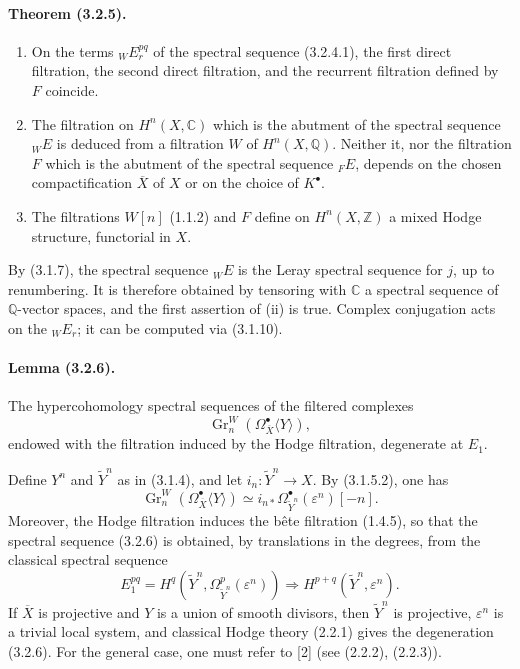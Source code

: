 \documentclass[10pt]{article}
\newcommand{\C}{\mathbb C}
\newcommand{\Q}{\mathbb Q}
\newcommand{\Z}{\mathbb Z}
\newcommand{\Gr}{\operatorname{Gr}}
\begin{document}
\paragraph{Theorem (3.2.5).}
\begin{enumerate}[label=(\roman*)]
\item On the terms ${}_WE_r^{pq}$ of the spectral sequence (3.2.4.1), the first direct filtration, the second direct filtration, and the recurrent filtration defined by $F$ coincide.
\item The filtration on $H^n(X,\C)$ which is the abutment of the spectral sequence ${}_WE$ is deduced from a filtration $W$ of $H^n(X,\Q)$. Neither it, nor the filtration $F$ which is the abutment of the spectral sequence ${}_FE$, depends on the chosen compactification $\overline X$ of $X$ or on the choice of $K^\bullet$.
\item The filtrations $W[n]$ (1.1.2) and $F$ define on $H^n(X,\Z)$ a mixed Hodge structure, functorial in $X$.
\end{enumerate}

By (3.1.7), the spectral sequence ${}_WE$ is the Leray spectral sequence for $j$, up to renumbering. It is therefore obtained by tensoring with $\C$ a spectral sequence of $\Q$-vector spaces, and the first assertion of (ii) is true. Complex conjugation acts on the ${}_WE_r$; it can be computed via (3.1.10).

\paragraph{Lemma (3.2.6).} The hypercohomology spectral sequences of the filtered complexes
\[
\Gr_n^W(\Omega_{\overline X}^{\bullet}\langle Y\rangle),
\]
endowed with the filtration induced by the Hodge filtration, degenerate at $E_1$.

Define $Y^n$ and $\widetilde Y^n$ as in (3.1.4), and let $i_n:\widetilde Y^n\to X$. By (3.1.5.2), one has
\[
\Gr_n^W(\Omega_{\overline X}^{\bullet}\langle Y\rangle)
\simeq i_{n*}\Omega_{\widetilde Y^n}^{\bullet}(\varepsilon^n)[-n].
\]
Moreover, the Hodge filtration induces the bête filtration (1.4.5), so that the spectral sequence (3.2.6) is obtained, by translations in the degrees, from the classical spectral sequence
\[
E_1^{pq}=H^q(\widetilde Y^n,\Omega_{\widetilde Y^n}^p(\varepsilon^n))
\Longrightarrow H^{p+q}(\widetilde Y^n,\varepsilon^n).
\]
If $\overline X$ is projective and $Y$ is a union of smooth divisors, then $\widetilde Y^n$ is projective, $\varepsilon^n$ is a trivial local system, and classical Hodge theory (2.2.1) gives the degeneration (3.2.6). For the general case, one must refer to [2] (see (2.2.2), (2.2.3)).
\end{document}
